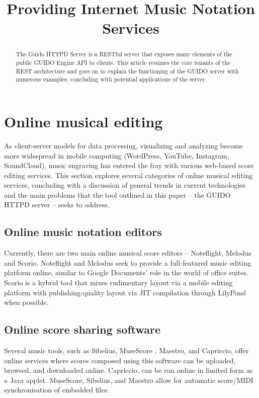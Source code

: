 \documentclass{article}
\title{Providing Internet Music Notation Services}
\date{}
\begin{document}
\maketitle

\begin{abstract}

The Guido HTTPD Server is a RESTful server that exposes many elements of the public GUIDO Engine API to clients.  This article resumes the core tenants of the REST architecture and goes on to explain the functioning of the GUIDO server with numerous examples, concluding with potential applications of the server.
\end{abstract}


\section{Online musical editing}\label{section:online-musical-editing}
As client-server models for data processing, visualizing and analyzing become more widespread in mobile computing (WordPress, YouTube, Instagram, SoundCloud), music engraving has entered the fray with various web-based score editing services.  This section explores several categories of online musical editing services, concluding with a discussion of general trends in current technologies and the main problems that the tool outlined in this paper -- the GUIDO HTTPD server -- seeks to address.
\subsection{Online music notation editors}\label{subsection:editor}
Currently, there are two main online musical score editors -- Noteflight, Melodus and Scorio.  Noteflight and Melodus seek to provide a full-featured music editing platform online, similar to Google Documents' role in the world of office suites.  Scorio is a hybrid tool that mixes rudimentary layout via a mobile editing platform with publishing-quality layout via JIT compilation through LilyPond when possible.
\subsection{Online score sharing software}\label{subsection:sharing}
Several music tools, such as Sibelius, MuseScore \cite{musescore}, Maestro, and Capriccio, offer online services where scores composed using this software can be uploaded, browsed, and downloaded online.  Capriccio, can be run online in limited form as a Java applet.  MuseScore, Sibelius, and Maestro allow for automatic score/MIDI synchronisation of embedded files.
\end{document}
